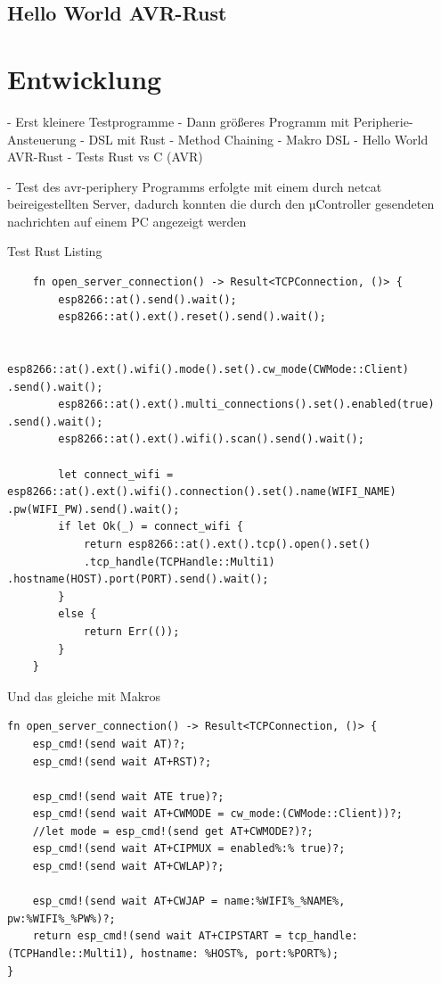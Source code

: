 \documentclass
[ 12pt,
  parskip=half %
]{scrreprt}
\newenvironment{mylisting}[1][H]
{\captionsetup{aboveskip=-0.2\normalbaselineskip}\begin{listing}[#1]}
	{\end{listing}}
\begin{document}
\section{Hello World AVR-Rust}




\chapter{Entwicklung}

- Erst kleinere Testprogramme
- Dann größeres Programm mit Peripherie-Ansteuerung
- DSL mit Rust
	- Method Chaining
	- Makro DSL
- Hello World AVR-Rust
- Tests Rust vs C (AVR)


- Test des avr-periphery Programms erfolgte mit einem durch netcat beireigestellten Server, dadurch konnten die durch den µController gesendeten nachrichten auf einem PC angezeigt werden
 
 
\begin{mylisting}[H]
	\caption{Test Rust Listing}
	\begin{verbatim}
	fn open_server_connection() -> Result<TCPConnection, ()> {
		esp8266::at().send().wait();
		esp8266::at().ext().reset().send().wait();

		esp8266::at().ext().wifi().mode().set().cw_mode(CWMode::Client) .send().wait();
		esp8266::at().ext().multi_connections().set().enabled(true) .send().wait();
		esp8266::at().ext().wifi().scan().send().wait();
		
		let connect_wifi = esp8266::at().ext().wifi().connection().set().name(WIFI_NAME) .pw(WIFI_PW).send().wait();
		if let Ok(_) = connect_wifi {
			return esp8266::at().ext().tcp().open().set()
			.tcp_handle(TCPHandle::Multi1) .hostname(HOST).port(PORT).send().wait();
		}
		else {
			return Err(());
		}
	}
	\end{verbatim}
\end{mylisting} 

\begin{mylisting}[H]
	\caption{Und das gleiche mit Makros}
	\begin{verbatim}
fn open_server_connection() -> Result<TCPConnection, ()> {
	esp_cmd!(send wait AT)?;
	esp_cmd!(send wait AT+RST)?;
	
	esp_cmd!(send wait ATE true)?;
	esp_cmd!(send wait AT+CWMODE = cw_mode:(CWMode::Client))?;
	//let mode = esp_cmd!(send get AT+CWMODE?)?; 
	esp_cmd!(send wait AT+CIPMUX = enabled%:% true)?;
	esp_cmd!(send wait AT+CWLAP)?;
	
	esp_cmd!(send wait AT+CWJAP = name:%WIFI%_%NAME%, pw:%WIFI%_%PW%)?;
	return esp_cmd!(send wait AT+CIPSTART = tcp_handle:(TCPHandle::Multi1), hostname: %HOST%, port:%PORT%);
}
	\end{verbatim}
\end{mylisting} 
\end{document}
